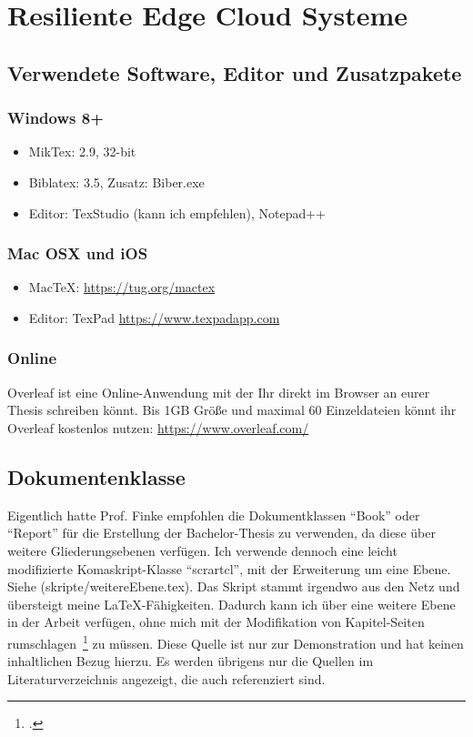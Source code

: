 \newpage
\section{Resiliente Edge Cloud Systeme} \label{latexDetails}

\subsection{Verwendete Software, Editor und Zusatzpakete}
\subsubsection{Windows 8+}
\begin{itemize}
\item MikTex: 2.9, 32-bit
\item Biblatex: 3.5, Zusatz: Biber.exe
\item Editor: TexStudio (kann ich empfehlen), Notepad++
\end{itemize}

\subsubsection{Mac OSX und iOS}
\begin{itemize}
\item MacTeX: \url{https://tug.org/mactex}
\item Editor: TexPad \url{https://www.texpadapp.com}
\end{itemize}

\subsubsection{Online}
Overleaf ist eine Online-Anwendung mit der Ihr direkt im Browser an eurer Thesis schreiben könnt. Bis 1GB Größe und maximal 60 Einzeldateien könnt ihr Overleaf kostenlos nutzen: \url{https://www.overleaf.com/}


\subsection{Dokumentenklasse}
Eigentlich hatte Prof. Finke empfohlen die Dokumentklassen \enquote{Book} oder \enquote{Report} für die Erstellung der Bachelor-Thesis zu verwenden, da diese über weitere Gliederungsebenen verfügen. Ich verwende dennoch eine leicht modifizierte Komaskript-Klasse \enquote{scrartcl}, mit der Erweiterung um eine Ebene. Siehe (skripte/weitereEbene.tex). Das Skript stammt irgendwo aus den Netz und übersteigt meine \LaTeX{}-Fähigkeiten. Dadurch kann ich über eine weitere Ebene in der Arbeit verfügen, ohne mich mit der Modifikation von Kapitel-Seiten rumschlagen~\footcite[Vgl. ][S. 5]{Tanenbaum.2003} zu müssen. Diese Quelle ist nur zur Demonstration und hat keinen inhaltlichen Bezug hierzu. Es werden übrigens nur die Quellen im Literaturverzeichnis angezeigt, die auch referenziert sind.


